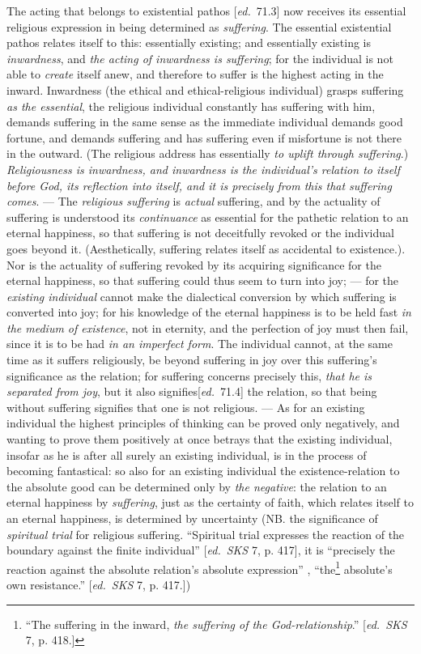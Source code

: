 \documentclass[12pt,a4paper,openany]{book}
\newcommand{\kpage}[1]{\marginnote{\footnotesize\textit{[#1]}}}
\newcommand{\ed}[1]{{\small[\textit{ed.}\ #1]}}
\begin{document}
The acting that belongs to existential pathos \ed{71.3} now receives its
essential religious expression in being determined as \emph{suffering}. The
\kpage{141}essential existential pathos relates itself to this: essentially
existing; and essentially existing is \emph{inwardness}, and \emph{the acting of inwardness
is suffering}; for the individual is not able to \emph{create} itself anew, and therefore
to suffer is the highest acting in the inward. Inwardness
(the ethical and ethical-religious individual) grasps suffering \emph{as the essential},
the religious individual constantly has suffering with him, demands suffering in the same
sense as the immediate individual demands good fortune, and demands
suffering and has suffering even if misfortune is not there in the outward.
(The religious address has essentially \emph{to uplift through suffering}.) \emph{Religiousness
is inwardness, and inwardness is the individual's relation to itself before
God, its reflection into itself, and it is precisely from this that suffering comes}. --- The
\emph{religious suffering} is \emph{actual} suffering, and by the actuality of suffering is understood
its \emph{continuance} as essential for the pathetic relation to an
eternal happiness, so that suffering is not deceitfully revoked or the individual
goes beyond it. (Aesthetically, suffering relates itself as accidental
to existence.). Nor is the actuality of suffering revoked
by its acquiring significance for the eternal happiness, so that
suffering could thus seem to turn into joy; --- for the \emph{existing individual}
cannot make the dialectical conversion by which suffering is converted
into joy; for his knowledge of the eternal happiness is to be held fast
\emph{in the medium of existence}, not in eternity, and the perfection of joy must
then fail, since it is to be had \emph{in an imperfect
form}. The individual cannot, at the same time as it suffers religiously,
be beyond suffering in joy over this suffering's significance as the relation;
for suffering concerns precisely this, \emph{that he is separated from joy},
but it also signifies\ed{71.4} the relation, so that being without suffering
signifies that one is not religious. --- As for an existing individual
the highest principles of thinking can be proved only negatively, and
wanting to prove them positively at once betrays that the existing individual, insofar as
he is after all surely an existing individual, is in the process of becoming fantastical:
so also for an existing individual the existence-relation to
the absolute good can be determined only by \emph{the negative}: the relation to
an eternal happiness by \emph{suffering}, just as the certainty of faith, which relates
itself to an eternal happiness, is determined by uncertainty (NB. the significance of
\emph{spiritual trial} for religious suffering. ``Spiritual trial expresses
the reaction of the boundary against the finite individual'' \ed{\emph{SKS} 7, p. 417}, it
is ``precisely the reaction against the absolute relation's absolute expression''
\kpage{142}\ed{\emph{SKS} 7, p. 417}, ``the\footnote[73]{``The suffering in the inward, \emph{the suffering of the God-relationship}.'' \ed{\emph{SKS} 7, p. 418.}}
absolute's own resistance.'' \ed{\emph{SKS} 7, p. 417.})
\end{document}

